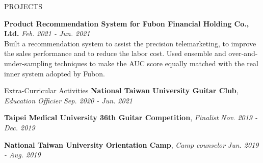 \documentclass{resume} %
\begin{document}
\begin{rSection}{PROJECTS}
\item \textbf{Product Recommendation System for Fubon Financial Holding Co., Ltd.} \hfill \textit{Feb. 2021 - Jun. 2021} \\
Built a recommendation system to assist the precision telemarketing, to improve the sales performance and to reduce the labor cost. Used ensemble and over-and-under-sampling techniques to make the AUC score equally matched with the real inner system adopted by Fubon.




\end{rSection} 

\begin{rSection}{Extra-Curricular Activities} 
\textbf{National Taiwan University Guitar Club}, \textit{Education Officier} \hfill \textit{Sep. 2020 - Jun. 2021}

\textbf{Taipei Medical University 36th Guitar Competition}, \textit{Finalist}  \hfill \textit{Nov. 2019 - Dec. 2019} 


\textbf{National Taiwan University Orientation Camp}, \textit{Camp counselor}  \hfill \textit{Jun. 2019 - Aug. 2019} 



\end{rSection}

\end{document}
